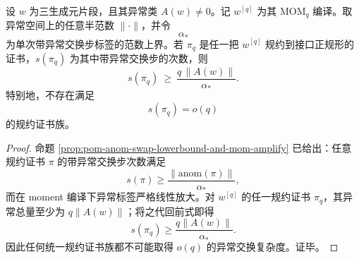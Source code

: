 \begin{theorem}[异常类的证书长度不可压缩定理]\label{thm:conclusion-anomaly-certificate-linear-incompressibility}
设 \(w\) 为三生成元片段，且其异常类 \(A(w)\neq 0\)。记 \(w^{[q]}\) 为其 \(\mathrm{MOM}_q\) 编译。取异常空间上的任意半范数 \(\|\cdot\|\)，并令
\[
\alpha_\ast
\]
为单次带异常交换步标签的范数上界。若 \(\pi_q\) 是任一把 \(w^{[q]}\) 规约到接口正规形的证书，\(s(\pi_q)\) 为其中带异常交换步的次数，则
\[
s(\pi_q)\ \ge\ \frac{q\,\|A(w)\|}{\alpha_\ast}.
\]
特别地，不存在满足
\[
s(\pi_q)=o(q)
\]
的规约证书族。
\end{theorem}
\begin{proof}
命题 \ref{prop:pom-anom-swap-lowerbound-and-mom-amplify} 已给出：任意规约证书 \(\pi\) 的带异常交换步次数满足
\[
s(\pi)\ge \frac{\|\mathrm{anom}(\pi)\|}{\alpha_\ast},
\]
而在 moment 编译下异常标签严格线性放大。对 \(w^{[q]}\) 的任一规约证书 \(\pi_q\)，其异常总量至少为 \(q\|A(w)\|\)；将之代回前式即得
\[
s(\pi_q)\ge \frac{q\|A(w)\|}{\alpha_\ast}.
\]
因此任何统一规约证书族都不可能取得 \(o(q)\) 的异常交换复杂度。证毕。
\end{proof}

